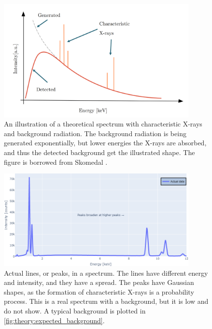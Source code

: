\begin{figure}[p]
    \centering
    \includegraphics[width=0.9\textwidth]{figures/expected_spectrum_Skomedal.png}
    \caption{
        An illustration of a theoretical spectrum with characteristic X-rays and background radiation.
        The background radiation is being generated exponentially, but lower energies the X-rays are absorbed, and thus the detected background get the illustrated shape.
        The figure is borrowed from Skomedal \cite[Fig. 2.8]{skomedal_improving_2022}.
    }
    \label{fig:theory:expected_spectrum_Skomedal}
\end{figure}


\begin{figure}[p]
    \centering
    \includegraphics[width=0.9\textwidth]{figures/actual_peaks.png}
    \caption{
        Actual lines, or peaks, in a spectrum.
        The lines have different energy and intensity, and they have a spread.
        The peaks have Gaussian shapes, as the formation of characteristic X-rays is a probability process.
        This is a real spectrum with a background, but it is low and do not show.
        A typical background is plotted in \cref{fig:theory:expected_background}.
    }
    \label{fig:theory:actual_peaks}
\end{figure}


